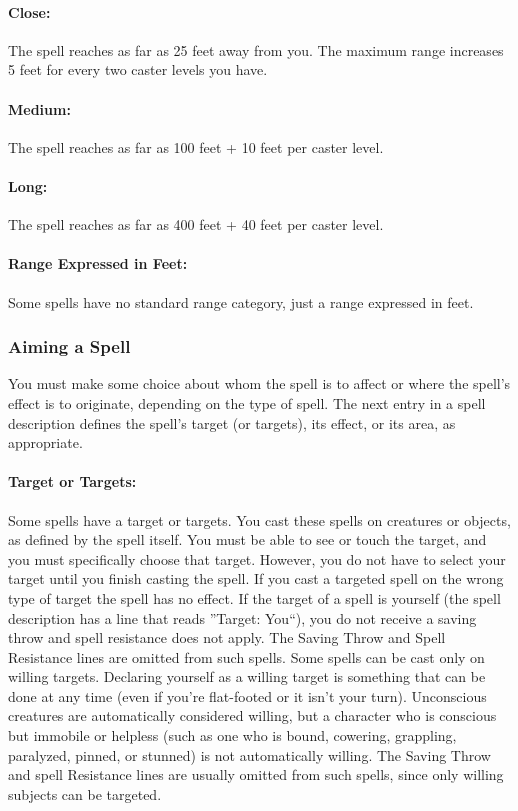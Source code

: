 \paragraph{Close:} The spell reaches as far as 25 feet away from you. The maximum range increases 5 feet for every two caster levels you have.

\paragraph{Medium:} The spell reaches as far as 100 feet + 10 feet per caster level.

\paragraph{Long:} The spell reaches as far as 400 feet + 40 feet per caster level.

\paragraph{Range Expressed in Feet:} Some spells have no standard range category, just a range expressed in feet.

\subsubsection{Aiming a Spell}
You must make some choice about whom the spell is to affect or where the spell's effect is to originate, 
depending on the type of spell. The next entry in a spell description defines the spell's target (or targets), its effect, or its area, as appropriate.

\paragraph{Target or Targets:} Some spells have a target or targets. You cast these spells on creatures or objects, as defined by the spell itself. 
You must be able to see or touch the target, and you must specifically choose that target. 
However, you do not have to select your target until you finish casting the spell.
If you cast a targeted spell on the wrong type of target the spell has no effect. 
If the target of a spell is yourself (the spell description has a line that reads ''Target: You``), 
you do not receive a saving throw and spell resistance does not apply. 
The Saving Throw and Spell Resistance lines are omitted from such spells.
Some spells can be cast only on willing targets. 
Declaring yourself as a willing target is something that can be done at any time (even if you're flat-footed or it isn't your turn). 
Unconscious creatures are automatically considered willing, but a character who is conscious but immobile or helpless (such as one who is bound, cowering, grappling, paralyzed, pinned, or stunned) is not automatically willing. 
The Saving Throw and spell Resistance lines are usually omitted from such spells, since only willing subjects can be targeted.

